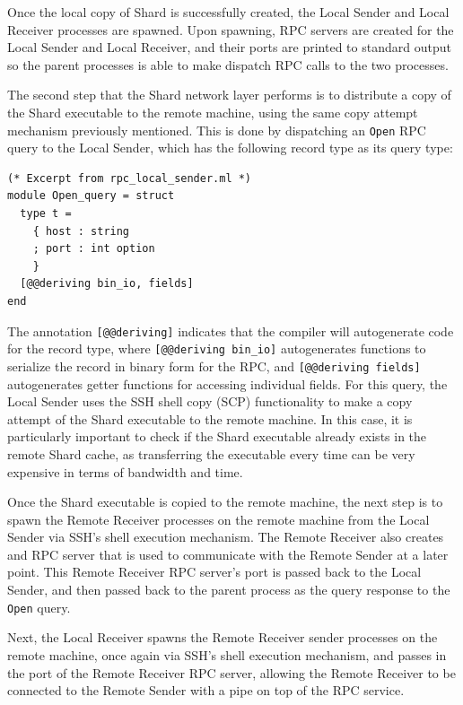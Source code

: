 \documentclass[oneside]{report}
\begin{document}
Once the local copy of Shard is successfully created, the Local Sender and Local Receiver processes are spawned.
Upon spawning, RPC servers are created for the Local Sender and Local Receiver, and their ports are printed to standard output so the parent processes is able to make dispatch RPC calls to the two processes.

The second step that the Shard network layer performs is to distribute a copy of the Shard executable to the remote machine, using the same copy attempt mechanism previously mentioned.
This is done by dispatching an \texttt{Open} RPC query to the Local Sender, which has the following record type as its query type:

\begin{minipage}[c]{\textwidth-15pt}
  \begin{lstlisting}
(* Excerpt from rpc_local_sender.ml *)
module Open_query = struct
  type t =
    { host : string
    ; port : int option
    }
  [@@deriving bin_io, fields]
end
\end{lstlisting}
  \smallskip
\end{minipage}

The annotation \texttt{[@@deriving]} indicates that the compiler will autogenerate code for the record type, where \texttt{[@@deriving bin\_io]} autogenerates functions to serialize the record in binary form for the RPC, and \texttt{[@@deriving fields]} autogenerates getter functions for accessing individual fields.
For this query, the Local Sender uses the SSH shell copy (SCP) functionality to make a copy attempt of the Shard executable to the remote machine.
In this case, it is particularly important to check if the Shard executable already exists in the remote Shard cache, as transferring the executable every time can be very expensive in terms of bandwidth and time.

Once the Shard executable is copied to the remote machine, the next step is to spawn the Remote Receiver processes on the remote machine from the Local Sender via SSH's shell execution mechanism.
The Remote Receiver also creates and RPC server that is used to communicate with the Remote Sender at a later point.
This Remote Receiver RPC server's port is passed back to the Local Sender, and then passed back to the parent process as the query response to the \texttt{Open} query.

Next, the Local Receiver spawns the Remote Receiver sender processes on the remote machine, once again via SSH's shell execution mechanism, and passes in the port of the Remote Receiver RPC server, allowing the Remote Receiver to be connected to the Remote Sender with a pipe on top of the RPC service.
\end{document}
